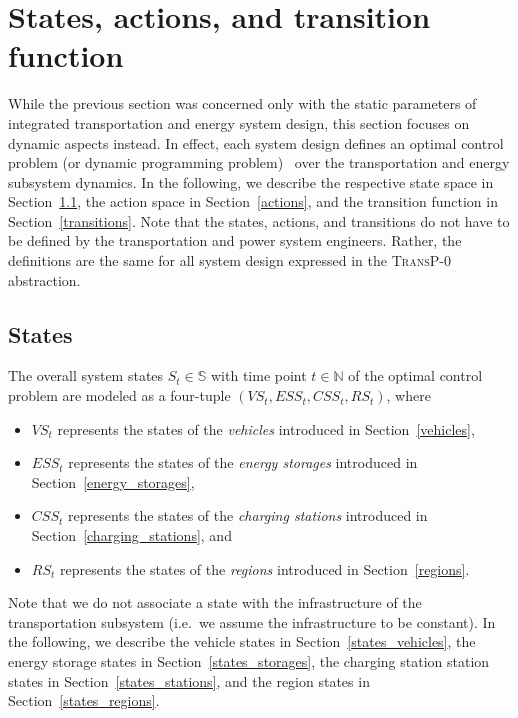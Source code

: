 \section{States, actions, and transition function}
\label{dynamics}

While the previous section was concerned only with the static parameters of integrated transportation and energy system design, this section focuses on dynamic aspects instead. In effect, each system design defines an optimal control problem (or dynamic programming problem)~\cite{Bertsekas1995} over the transportation and energy subsystem dynamics. In the following, we describe the respective state space in Section~\ref{states}, the action space in Section~\ref{actions}, and the transition function in Section~\ref{transitions}. Note that the states, actions, and transitions do not have to be defined by the transportation and power system engineers. Rather, the definitions are the same for all system design expressed in the \textsc{TransP-0} abstraction.

\subsection{States}
\label{states}

The overall system states $S_t \in \mathbb{S}$ with time point $t \in \mathbb{N}$ of the optimal control problem are modeled as a four-tuple $(VS_t, ESS_t, CSS_t, RS_t)$, where
\begin{itemize}
	\item $VS_t$ represents the states of the \textit{vehicles} introduced in Section~\ref{vehicles},
	\item $ESS_t$ represents the states of the \textit{energy storages} introduced in Section~\ref{energy_storages},
	\item $CSS_t$ represents the states of the \textit{charging stations} introduced in Section~\ref{charging_stations}, and
	\item $RS_t$ represents the states of the \textit{regions} introduced in Section~\ref{regions}.
\end{itemize}
Note that we do not associate a state with the infrastructure of the transportation subsystem (i.e.\ we assume the infrastructure to be constant). In the following, we describe the vehicle states in Section~\ref{states_vehicles}, the energy storage states in Section~\ref{states_storages}, the charging station station states in Section~\ref{states_stations}, and the region states in Section~\ref{states_regions}.

